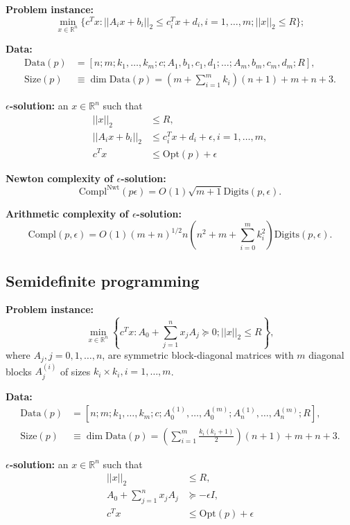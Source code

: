 \documentclass[11pt,a4paper]{article}
\newcommand{\R}{\mathbb{R}}
\begin{document}
\textbf{Problem instance:}
\begin{equation}
    \underset{x \in \R^n}{\min} \{c^Tx : ||A_ix+b_i||_2 \leq c_i^Tx+d_i, i=1,\dots, m; ||x||_2 \leq R\};\tag{$p$}
\end{equation}

\textbf{Data:}
\begin{align*}
    \text{Data}(p) &= [n;m;k_1,\dots,k_m;c;A_1,b_1,c_1,d_1;\dots;A_m,b_m,c_m,d_m;R],\\
    \text{Size}(p) &\equiv \dim \text{Data}(p) = (m+\sum_{i=1}^{m}k_i)(n+1)+m+n+3.
\end{align*}

\textbf{$\epsilon$-solution:} an $x \in \R^n$ such that
\begin{align*}
    ||x||_2 &\leq R,\\
    ||A_ix+b_i||_2 &\leq c_i^Tx+d_i+\epsilon, i=1,\dots,m,\\
    c^Tx &\leq \text{Opt}(p)+\epsilon
\end{align*}

\textbf{Newton complexity of $\epsilon$-solution:}
\[\text{Compl}^\text{Nwt}(p\epsilon) = O(1)\sqrt{m+1}\text{Digits}(p,\epsilon).\]

\textbf{Arithmetic complexity of $\epsilon$-solution:}
\[\text{Compl}(p,\epsilon) = O(1)(m+n)^{1/2}n\left(n^2+m+\sum_{i=0}^m k_i^2\right)\text{Digits}(p,\epsilon).\]

\subsection{Semidefinite programming}

\textbf{Problem instance:}
\begin{equation}
    \underset{x \in \R^n}{\min} \left\{ c^Tx : A_0+\sum_{j=1}^n x_j A_j \succeq 0; ||x||_2 \leq R \right\},\tag{$p$}
\end{equation}
where $A_j, j=0,1,\dots,n$, are symmetric block-diagonal matrices with $m$ diagonal blocks $A_j^(i)$ of sizes $k_i\times k_i, i=1,\dots,m$.

\textbf{Data:}
\begin{align*}
    \text{Data}(p) &= [n;m;k_1,\dots,k_m;c;A_0^{(1)},\dots,A_0^{(m)};A_n^{(1)},\dots,A_n^{(m)};R],\\
    \text{Size}(p) &\equiv \dim \text{Data}(p) = \left(\sum_{i=1}^{m}\frac{k_i(k_i+1)}{2}\right)(n+1)+m+n+3.
\end{align*}

\textbf{$\epsilon$-solution:} an $x \in \R^n$ such that
\begin{align*}
    ||x||_2 &\leq R,\\
    A_0+\sum_{j=1}^n x_jA_j &\succeq -\epsilon I,\\
    c^Tx &\leq \text{Opt}(p)+\epsilon
\end{align*}
\end{document}

